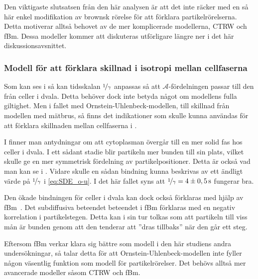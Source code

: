 
Den viktigaste slutsatsen från den här analysen är att det inte räcker med en så här enkel modifikation av brownsk rörelse för att förklara partikelrörelserna. Detta motiverar alltså behovet av de mer komplicerade modellerna, CTRW och fBm. Dessa modeller kommer att diskuteras utförligare längre ner i det här diskussionsavsnittet.


\subsubsection{Modell för att förklara skillnad i isotropi mellan cellfaserna}
Som kan ses i  så kan tidsskalan $\nicefrac{1}{\gamma}$ anpassas så att $\mathcal{A}$-fördelningen passar till den från celler i dvala. Detta behöver dock inte betyda något om modellens fulla giltighet. Men i fallet med Ornstein-Uhlenbeck-modellen, till skillnad från modellen med mätbrus, så finns det indikationer som skulle kunna användas för att förklara skillnaden mellan cellfaserna i .

I \cite{Midtveldt_etal2016} finner man antydningar om att cytoplasman övergår till en mer solid fas hos celler i dvala. I ett sådant stadie blir partikeln mer bunden till sin plats, vilket skulle ge en mer symmetrisk fördelning av partikelpositioner. Detta är också vad man kan se i . Vidare skulle en sådan bindning kunna beskrivas av ett ändligt värde på $\nicefrac{1}{\gamma}$ i \eqref{eq:SDE_o-u}. I det här fallet syns att $\nicefrac{1}{\gamma}=\unit[4\pm 0,5]{s}$ fungerar bra.

Den ökade bindningen för celler i dvala kan dock också förklaras med hjälp av fBm~\cite{Midtveldt_etal2016}. Det subdiffusiva beteendet beteendet i fBm förklaras med en negativ korrelation i partikelstegen. Detta kan i sin tur tolkas som att partikeln till viss mån är bunden genom att den tenderar att ''dras tillbaks'' när den går ett steg. 

Eftersom fBm verkar klara sig bättre som modell i den här studiens andra undersökningar, så talar detta för att Ornstein-Uhlenbeck-modellen inte fyller någon väsentlig funktion som modell för partikelrörelser. Det behövs alltså mer avancerade modeller såsom CTRW och fBm.

